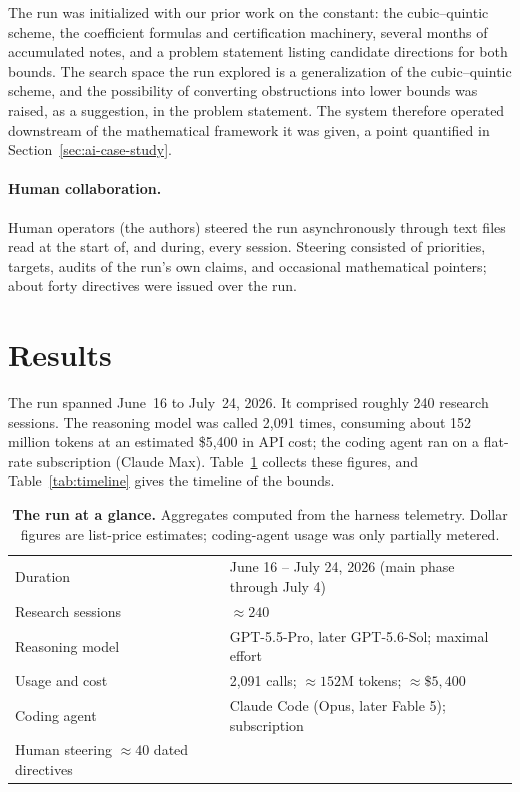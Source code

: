 The run was initialized with our prior work on the constant: the
cubic--quintic scheme, the coefficient formulas and certification
machinery, several months of accumulated notes, and a problem statement
listing candidate directions for both bounds. The search space the run
explored is a generalization of the cubic--quintic scheme, and the
possibility of converting obstructions into lower bounds was raised, as a
suggestion, in the problem statement. The system therefore operated
downstream of the mathematical framework it was given, a point quantified
in Section~\ref{sec:ai-case-study}.

\paragraph{Human collaboration.}
Human operators (the authors) steered the run asynchronously
through text files read at the start of, and during, every session.
Steering consisted of priorities, targets, audits of the run's own claims,
and occasional mathematical pointers; about forty directives were
issued over the run. 

\section{Results}
\label{sec:ai-results}

The run spanned June~16 to July~24, 2026. It comprised
roughly 240 research sessions. The reasoning model was called 2{,}091
times, consuming about 152 million tokens at an estimated \$5{,}400 in
API cost; the coding agent ran on a flat-rate subscription (Claude Max).
Table~\ref{tab:run} collects these figures, and
Table~\ref{tab:timeline} gives the timeline of the bounds.

\begin{table}[t]
\centering
\small
\begin{tabular}{@{}ll@{}}
\toprule
Duration & June 16 -- July 24, 2026 (main phase through July 4)\\
Research sessions & $\approx240$\\
Reasoning model & GPT-5.5-Pro, later GPT-5.6-Sol; maximal effort\\
Usage and cost & 2{,}091 calls; $\approx152$M tokens; $\approx\$5{,}400$\\
Coding agent & Claude Code (Opus, later Fable 5); subscription\\
Human steering  $\approx40$ dated directives\\
\bottomrule
\end{tabular}
\caption{\textbf{The run at a glance.} Aggregates computed from the harness
telemetry. Dollar figures are list-price estimates; coding-agent usage was
only partially metered.
}
\label{tab:run}
\end{table}

